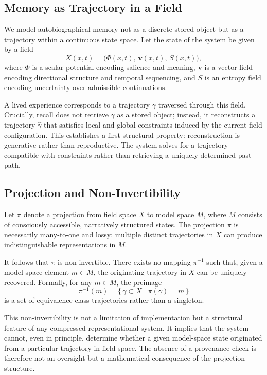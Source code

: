 \documentclass[12pt, a4paper]{article}
\begin{document}
\subsection{Memory as Trajectory in a Field}

We model autobiographical memory not as a discrete stored object but as a trajectory within a continuous state space. Let the state of the system be given by a field
\[
X(x,t) = \bigl(\Phi(x,t),\, \mathbf{v}(x,t),\, S(x,t)\bigr),
\]
where $\Phi$ is a scalar potential encoding salience and meaning, $\mathbf{v}$ is a vector field encoding directional structure and temporal sequencing, and $S$ is an entropy field encoding uncertainty over admissible continuations.

A lived experience corresponds to a trajectory $\gamma$ traversed through this field. Crucially, recall does not retrieve $\gamma$ as a stored object; instead, it reconstructs a trajectory $\hat{\gamma}$ that satisfies local and global constraints induced by the current field configuration. This establishes a first structural property: reconstruction is generative rather than reproductive. The system solves for a trajectory compatible with constraints rather than retrieving a uniquely determined past path.

\subsection{Projection and Non-Invertibility}

Let $\pi$ denote a projection from field space $X$ to model space $M$, where $M$ consists of consciously accessible, narratively structured states. The projection $\pi$ is necessarily many-to-one and lossy: multiple distinct trajectories in $X$ can produce indistinguishable representations in $M$.

It follows that $\pi$ is non-invertible. There exists no mapping $\pi^{-1}$ such that, given a model-space element $m \in M$, the originating trajectory in $X$ can be uniquely recovered. Formally, for any $m \in M$, the preimage
\[
\pi^{-1}(m) = \bigl\{\, \gamma \subset X \mid \pi(\gamma) = m \,\bigr\}
\]
is a set of equivalence-class trajectories rather than a singleton.

This non-invertibility is not a limitation of implementation but a structural feature of any compressed representational system. It implies that the system cannot, even in principle, determine whether a given model-space state originated from a particular trajectory in field space. The absence of a provenance check is therefore not an oversight but a mathematical consequence of the projection structure.
\end{document}
